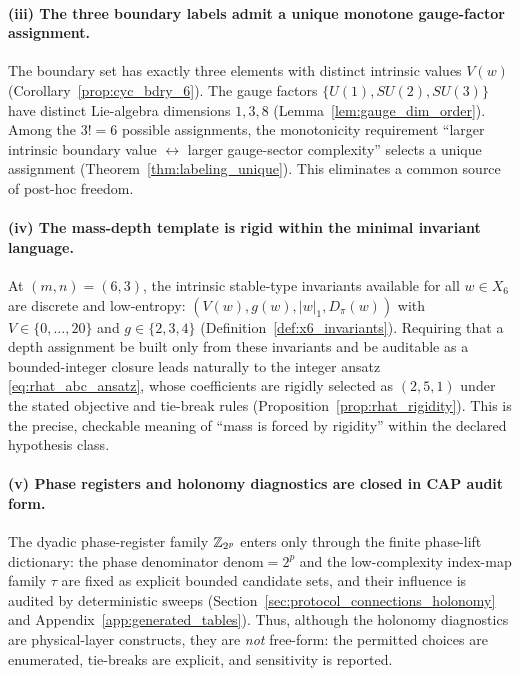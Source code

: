 \paragraph{(iii) The three boundary labels admit a unique monotone gauge-factor assignment.}
The boundary set has exactly three elements with distinct intrinsic values $V(w)$ (Corollary~\ref{prop:cyc_bdry_6}).
The gauge factors $\{U(1),SU(2),SU(3)\}$ have distinct Lie-algebra dimensions $1,3,8$ (Lemma~\ref{lem:gauge_dim_order}).
Among the $3!=6$ possible assignments, the monotonicity requirement ``larger intrinsic boundary value $\leftrightarrow$ larger gauge-sector complexity'' selects a unique assignment (Theorem~\ref{thm:labeling_unique}).
This eliminates a common source of post-hoc freedom.

\paragraph{(iv) The mass-depth template is rigid within the minimal invariant language.}
At $(m,n)=(6,3)$, the intrinsic stable-type invariants available for all $w\in X_6$ are discrete and low-entropy: $(V(w),g(w),|w|_1,D_\pi(w))$ with $V\in\{0,\dots,20\}$ and $g\in\{2,3,4\}$ (Definition~\ref{def:x6_invariants}).
Requiring that a depth assignment be built only from these invariants and be auditable as a bounded-integer closure leads naturally to the integer ansatz \eqref{eq:rhat_abc_ansatz}, whose coefficients are rigidly selected as $(2,5,1)$ under the stated objective and tie-break rules (Proposition~\ref{prop:rhat_rigidity}).
This is the precise, checkable meaning of ``mass is forced by rigidity'' within the declared hypothesis class.

\paragraph{(v) Phase registers and holonomy diagnostics are closed in CAP audit form.}
The dyadic phase-register family $\mathbb{Z}_{2^p}$ enters only through the finite phase-lift dictionary:
the phase denominator $\mathrm{denom}=2^p$ and the low-complexity index-map family $\tau$ are fixed as explicit bounded candidate sets, and their influence is audited by deterministic sweeps (Section~\ref{sec:protocol_connections_holonomy} and Appendix~\ref{app:generated_tables}).
Thus, although the holonomy diagnostics are physical-layer constructs, they are \emph{not} free-form: the permitted choices are enumerated, tie-breaks are explicit, and sensitivity is reported.

